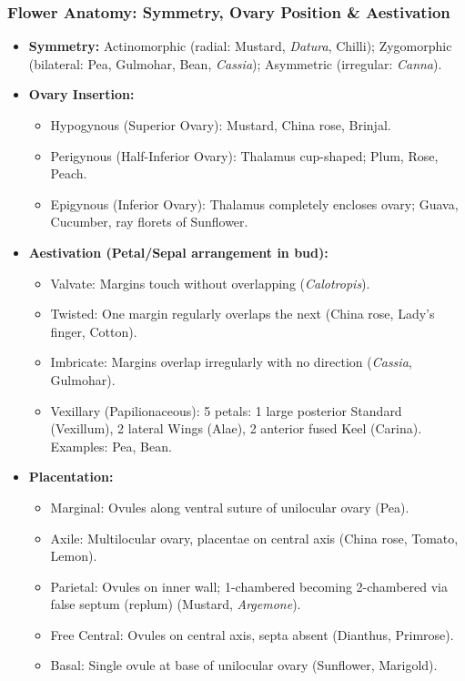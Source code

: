 \documentclass[11pt,a4paper]{article}
\begin{document}
\subsubsection{Flower Anatomy: Symmetry, Ovary Position \& Aestivation}
\begin{itemize}[leftmargin=1.5em, itemsep=2pt]
  \item \textbf{Symmetry:} Actinomorphic (radial: Mustard, \textit{Datura}, Chilli); Zygomorphic (bilateral: Pea, Gulmohar, Bean, \textit{Cassia}); Asymmetric (irregular: \textit{Canna}).
  \item \textbf{Ovary Insertion:}
  \begin{itemize}[label=$\circ$]
    \item Hypogynous (Superior Ovary): Mustard, China rose, Brinjal.
    \item Perigynous (Half-Inferior Ovary): Thalamus cup-shaped; Plum, Rose, Peach.
    \item Epigynous (Inferior Ovary): Thalamus completely encloses ovary; Guava, Cucumber, ray florets of Sunflower.
  \end{itemize}
  \item \textbf{Aestivation (Petal/Sepal arrangement in bud):}
  \begin{itemize}[label=$\circ$]
    \item Valvate: Margins touch without overlapping (\textit{Calotropis}).
    \item Twisted: One margin regularly overlaps the next (China rose, Lady's finger, Cotton).
    \item Imbricate: Margins overlap irregularly with no direction (\textit{Cassia}, Gulmohar).
    \item Vexillary (Papilionaceous): 5 petals: 1 large posterior Standard (Vexillum), 2 lateral Wings (Alae), 2 anterior fused Keel (Carina). Examples: Pea, Bean.
  \end{itemize}
  \item \textbf{Placentation:}
  \begin{itemize}[label=$\circ$]
    \item Marginal: Ovules along ventral suture of unilocular ovary (Pea).
    \item Axile: Multilocular ovary, placentae on central axis (China rose, Tomato, Lemon).
    \item Parietal: Ovules on inner wall; 1-chambered becoming 2-chambered via false septum (replum) (Mustard, \textit{Argemone}).
    \item Free Central: Ovules on central axis, septa absent (Dianthus, Primrose).
    \item Basal: Single ovule at base of unilocular ovary (Sunflower, Marigold).
  \end{itemize}
\end{itemize}
\end{document}
